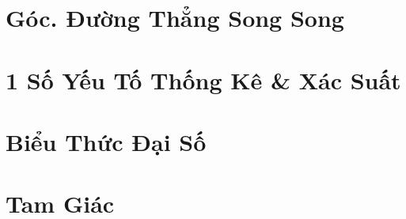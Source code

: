 \documentclass{article}
\numberwithin{equation}{section}
\begin{document}

\section{Góc. Đường Thẳng Song Song}


\section{1 Số Yếu Tố Thống Kê \& Xác Suất}


\section{Biểu Thức Đại Số}


\section{Tam Giác}


\printbibliography[heading=bibintoc]
	
\end{document}

